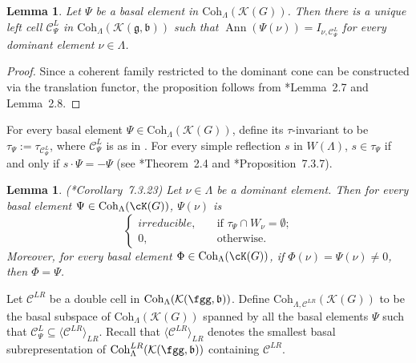 \documentclass[12pt]{amsart}
\def\subset{\subseteq}
\newcommand{\CC}{{\mathcal {C}}}
\newcommand{\CK}{{\mathcal {K}}}
\newcommand{\CO}{{\mathcal {O}}}
\DeclareMathOperator{\Ann}{Ann}
\newcommand{\g}{\mathfrak g}
\renewcommand{\b}{\mathfrak b}
\newcommand{\la}{\langle}
\newcommand{\ra}{\rangle}
\numberwithin{equation}{section}
\newtheorem{lem}[thm]{Lemma}
\theoremstyle{remark}
\def\Coh{\mathrm{Coh}}
\begin{document}
\begin{lem}\label{annlc}
Let $\Psi$ be a basal element in $\Coh_\Lambda(\CK(G))$. Then there is a unique left cell $\CC^L_\Psi$ in  $\Coh_\Lambda(\CK(\g,\b))$ such that $ \Ann(\Psi(\nu))=I_{\nu, \CC^L_\Psi}$ for every dominant element $\nu\in \Lambda$.
\end{lem}
\begin{proof}
Since a coherent family restricted to the dominant cone can be constructed via the translation functor,
 the proposition follows from \cite{V1}*{Lemma~2.7 and Lemma~2.8}.
\end{proof}


For every  basal element $\Psi\in \Coh_\Lambda(\CK(G))$, define its $\tau$-invariant to be
 $\tau_\Psi:=\tau_{\CC^L_\Psi}$,  where $\CC^L_\Psi$ is as in .
For every simple reflection $s$ in $W(\Lambda)$, $s\in \tau_\Psi$ if and only if
$s\cdot \Psi=-\Psi$ (see \cite{Vtau}*{Theorem~2.4} and \cite{Vg}*{Proposition~7.3.7}).


\begin{lem}\label{lemirr} (\cite{V4}*{Corollary~7.3.23})
Let $\nu\in \Lambda$ be a dominant element.
Then for every  basal element $\Psi\in \Coh_\Lambda(\cK(G))$,  $ \Psi(\nu)$ is
\[
\left\{
\begin{array}{ll}
irreducible,\quad & \text{if $\tau_{\Psi}\cap W_\nu = \emptyset$;}\\
0, \quad &\textrm{otherwise}.
\end{array}
\right.
\]
Moreover, for every basal element $\Phi \in \Coh_\Lambda(\cK(G))$, if  $\Phi (\nu)=\Psi(\nu)\neq 0$, then $\Phi =\Psi$.
\end{lem}

Let $\CC^{LR}$ be a double cell in $\Coh_\Lambda(\CK(\fgg,\b))$. Define
$\Coh_{\Lambda, \CC^{LR}}(\CK(G))$ to be the basal subspace of $\Coh_\Lambda(\CK(G))$ spanned by all the basal elements $\Psi$ such that $\CC^L_\Psi\subseteq \la \CC^{LR}\ra_{LR}$.
Recall that $\la \CC^{LR}\ra_{LR}$ denotes the smallest basal subrepresentation of $\Coh^{LR}_\Lambda(\CK(\fgg,\b))$ containing $\CC^{LR}$.
\end{document}
